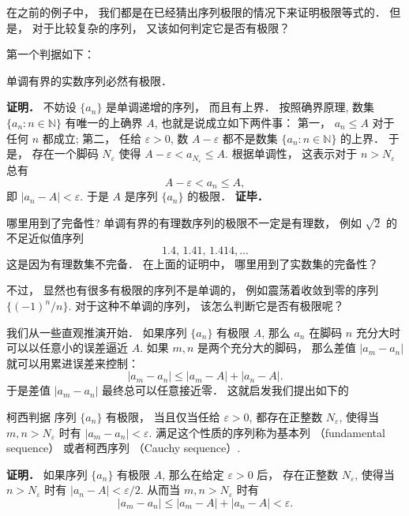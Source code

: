 

在之前的例子中， 我们都是在已经猜出序列极限的情况下来证明极限等式的． 但是， 对于比较复杂的序列， 又该如何判定它是否有极限？

第一个判据如下：

\begin{theorem}{}
单调有界的实数序列必然有极限．
\end{theorem}
\textbf{证明．} 不妨设 $\{a_n\}$ 是单调递增的序列， 而且有上界． 按照确界原理, 数集 $\{a_n:n\in\mathbb{N}\}$ 有唯一的上确界 $A$, 也就是说成立如下两件事： 第一， $a_n\leq A$ 对于任何 $n$ 都成立; 第二， 任给 $\varepsilon>0$, 数 $A-\varepsilon$ 都不是数集 $\{a_n:n\in\mathbb{N}\}$ 的上界． 于是， 存在一个脚码 $N_\varepsilon$ 使得 $A-\varepsilon<a_{N_\varepsilon}\leq A$. 根据单调性， 这表示对于 $n>N_\varepsilon$ 总有
\[A-\varepsilon<a_n\leq A,\]
即 $|a_n-A|<\varepsilon$. 于是 $A$ 是序列 $\{a_n\}$ 的极限． \textbf{证毕．}

\begin{exercise}{哪里用到了完备性?}
单调有界的有理数序列的极限不一定是有理数， 例如 $\sqrt{2}$ 的不足近似值序列
$$
1.4,\,1.41,\,1.414,...
$$
这是因为有理数集不完备． 在上面的证明中， 哪里用到了实数集的完备性？
\end{exercise}

不过， 显然也有很多有极限的序列不是单调的， 例如震荡着收敛到零的序列 $\{(-1)^n/n\}$. 对于这种不单调的序列， 该怎么判断它是否有极限呢？

我们从一些直观推演开始． 如果序列 $\{a_n\}$ 有极限 $A$, 那么 $a_n$ 在脚码 $n$ 充分大时可以以任意小的误差逼近 $A$. 如果 $m,n$ 是两个充分大的脚码， 那么差值 $|a_m-a_n|$ 就可以用累进误差来控制：
$$
|a_m-a_n|\leq |a_m-A|+|a_n-A|.
$$
于是差值 $|a_m-a_n|$ 最终总可以任意接近零． 这就启发我们提出如下的

\begin{theorem}{柯西判据}
序列 $\{a_n\}$ 有极限， 当且仅当任给 $\varepsilon>0$, 都存在正整数 $N_\varepsilon$, 使得当 $m,n>N_\varepsilon$ 时有 $|a_m-a_n|<\varepsilon$. 满足这个性质的序列称为基本列 （fundamental sequence） 或者柯西序列 （Cauchy sequence）.
\end{theorem}

\textbf{证明．} 如果序列 $\{a_n\}$ 有极限 $A$, 那么在给定 $\varepsilon>0$ 后， 存在正整数 $N_\varepsilon$, 使得当 $n>N_\varepsilon$ 时有 $|a_n-A|<\varepsilon/2$. 从而当 $m,n>N_\varepsilon$ 时有
$$
|a_m-a_n|\leq|a_m-A|+|a_n-A|<\varepsilon.
$$

